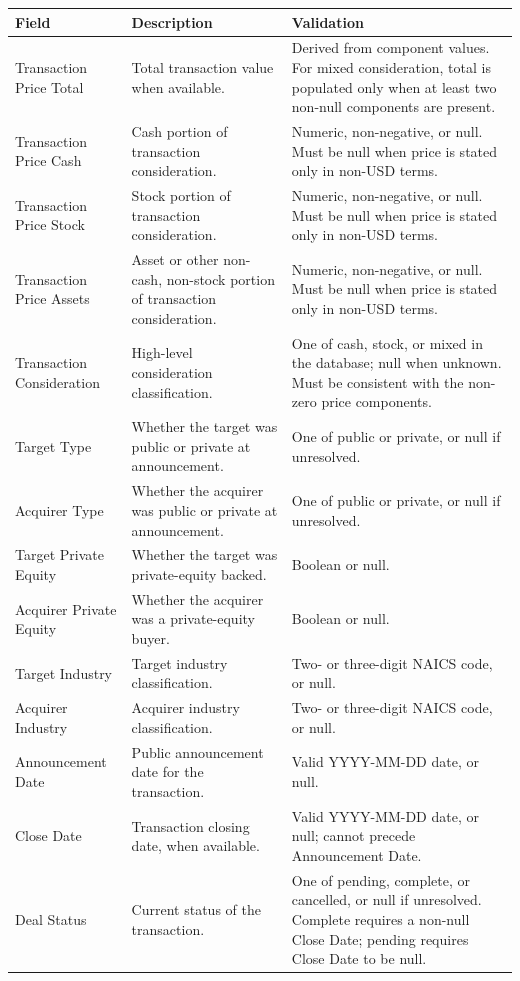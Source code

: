 \documentclass[12pt]{article}
\begin{document}
{\begin{appendices}
\begin{center}
\begin{longtable}{p{}p{}p{}}
\toprule
Field & Description & Validation \\
\midrule
\endhead

\bottomrule
\endfoot

Transaction Price Total & Total transaction value when available. & Derived from component values. For mixed consideration, total is populated only when at least two non-null components are present. \\
Transaction Price Cash & Cash portion of transaction consideration. & Numeric, non-negative, or null. Must be null when price is stated only in non-USD terms. \\
Transaction Price Stock & Stock portion of transaction consideration. & Numeric, non-negative, or null. Must be null when price is stated only in non-USD terms. \\
Transaction Price Assets & Asset or other non-cash, non-stock portion of transaction consideration. & Numeric, non-negative, or null. Must be null when price is stated only in non-USD terms. \\
Transaction Consideration & High-level consideration classification. & One of cash, stock, or mixed in the database; null when unknown. Must be consistent with the non-zero price components. \\
Target Type & Whether the target was public or private at announcement. & One of public or private, or null if unresolved. \\
Acquirer Type & Whether the acquirer was public or private at announcement. & One of public or private, or null if unresolved. \\
Target Private Equity & Whether the target was private-equity backed. & Boolean or null. \\
Acquirer Private Equity & Whether the acquirer was a private-equity buyer. & Boolean or null. \\
Target Industry & Target industry classification. & Two- or three-digit NAICS code, or null. \\
Acquirer Industry & Acquirer industry classification. & Two- or three-digit NAICS code, or null. \\
Announcement Date & Public announcement date for the transaction. & Valid YYYY-MM-DD date, or null. \\
Close Date & Transaction closing date, when available. & Valid YYYY-MM-DD date, or null; cannot precede Announcement Date. \\
Deal Status & Current status of the transaction. & One of pending, complete, or cancelled, or null if unresolved. Complete requires a non-null Close Date; pending requires Close Date to be null. \\

\end{longtable}
\end{center}
\end{appendices}}
\end{document}
